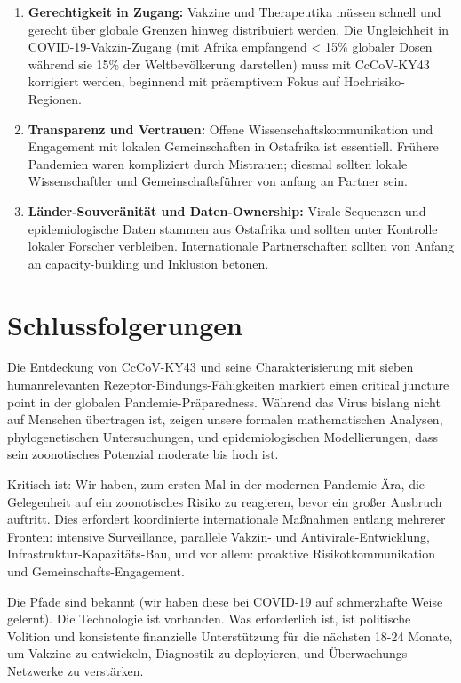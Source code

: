 ﻿\documentclass[11pt,a4paper]{article}
\theoremstyle{definition}
\begin{document}
\begin{enumerate}
\item \textbf{Gerechtigkeit in Zugang:} Vakzine und Therapeutika müssen schnell und gerecht über globale Grenzen hinweg distribuiert werden. Die Ungleichheit in COVID-19-Vakzin-Zugang (mit Afrika empfangend < 15\% globaler Dosen während sie 15\% der Weltbevölkerung darstellen) muss mit CcCoV-KY43 korrigiert werden, beginnend mit präemptivem Fokus auf Hochrisiko-Regionen.

\item \textbf{Transparenz und Vertrauen:} Offene Wissenschaftskommunikation und Engagement mit lokalen Gemeinschaften in Ostafrika ist essentiell. Frühere Pandemien waren kompliziert durch Mistrauen; diesmal sollten lokale Wissenschaftler und Gemeinschaftsführer von anfang an Partner sein.

\item \textbf{Länder-Souveränität und Daten-Ownership:} Virale Sequenzen und epidemiologische Daten stammen aus Ostafrika und sollten unter Kontrolle lokaler Forscher verbleiben. Internationale Partnerschaften sollten von Anfang an capacity-building und Inklusion betonen.
\end{enumerate}

\section{Schlussfolgerungen}

Die Entdeckung von CcCoV-KY43 und seine Charakterisierung mit sieben humanrelevanten Rezeptor-Bindungs-Fähigkeiten markiert einen critical juncture point in der globalen Pandemie-Präparedness. Während das Virus bislang nicht auf Menschen übertragen ist, zeigen unsere formalen mathematischen Analysen, phylogenetischen Untersuchungen, und epidemiologischen Modellierungen, dass sein zoonotisches Potenzial moderate bis hoch ist.

Kritisch ist: Wir haben, zum ersten Mal in der modernen Pandemie-Ära, die Gelegenheit auf ein zoonotisches Risiko zu reagieren, bevor ein großer Ausbruch auftritt. Dies erfordert koordinierte internationale Maßnahmen entlang mehrerer Fronten: intensive Surveillance, parallele Vakzin- und Antivirale-Entwicklung, Infrastruktur-Kapazitäts-Bau, und vor allem: proaktive Risikotkommunikation und Gemeinschafts-Engagement.

Die Pfade sind bekannt (wir haben diese bei COVID-19 auf schmerzhafte Weise gelernt). Die Technologie ist vorhanden. Was erforderlich ist, ist politische Volition und konsistente finanzielle Unterstützung für die nächsten 18-24 Monate, um Vakzine zu entwickeln, Diagnostik zu deployieren, und Überwachungs-Netzwerke zu verstärken.
\end{document}
